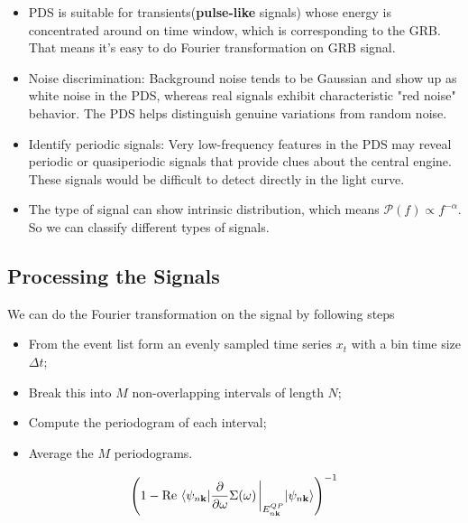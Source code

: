 \documentclass[prd,11pt]{revtex4-2}
\begin{document}
\begin{itemize}
    \item PDS is suitable for transients(\textbf{pulse-like} signals) whose energy is concentrated around on time window, which is  corresponding to the GRB. That means it's easy to do Fourier transformation on GRB signal.
    \item Noise discrimination: Background noise tends to be Gaussian and show up as white noise in the PDS, whereas real signals exhibit characteristic "red noise" behavior.  The PDS helps distinguish genuine variations from random noise.
    \item Identify periodic signals: Very low-frequency features in the PDS may reveal periodic or quasiperiodic signals that provide clues about the central engine.  These signals would be difficult to detect directly in the light curve.
    
    \item The type of signal can show intrinsic distribution, which means $\mathcal{P}(f)\propto f^{-\alpha}$. So we can classify different types of signals.
\end{itemize}

\subsection{Processing the Signals}

We can do the Fourier transformation on the signal by following steps

\begin{itemize}
    \item From the event list form an evenly sampled time series $x_t$ with a bin time size $\Delta t$; 
    \item Break this into $M$ non-overlapping intervals of length $N$; 
    \item Compute the periodogram of each interval; 
    \item Average the $M$ periodograms.
\end{itemize}

\begin{align}
    \left(1-\Re\mel{\psi_{n\mathbf{k}}}{\frac{\partial }{\partial \omega}\Sigma(\omega)\eval_{E^{QP}_{n\mathbf{k}}}}{\psi_{n\mathbf{k}}}\right)^{-1}
\end{align}
\newpage




\end{document}
